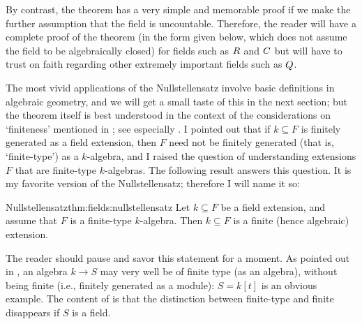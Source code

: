 By contrast, the theorem has a very simple and memorable proof if we
make the further assumption that the field is uncountable. Therefore,
the reader will have a complete proof of the theorem (in the form
given below, which does not assume the field to be algebraically
closed) for fields such as $R$ and $C$ but will have to trust on
faith regarding other extremely important fields such as $Q$.

The most vivid applications of the Nullstellensatz involve basic
definitions in algebraic geometry, and we will get a small taste of
this in the next section; but the theorem itself is best understood in
the context of the considerations on `finiteness' mentioned in
; see
especially . I pointed out that if
$k \subseteq F$ is finitely generated as a field extension, then $F$
need not be finitely generated (that is, `finite-type') as a
$k$-algebra, and I raised the question of understanding extensions $F$
that are finite-type $k$-algebras. The following result answers this
question. It is my favorite version of the Nullstellensatz; therefore
I will name it so:
\begin{thm}{Nullstellensatz}{thm:fields:nullstellensatz}
  Let $k \subseteq F$ be a field extension, and assume that $F$ is a
  finite-type $k$-algebra. Then $k \subseteq F$ is a finite (hence
  algebraic) extension.
\end{thm}
The reader should pause and savor this statement for a moment. As
pointed out in
, an algebra
$k \to S$ may very well be of finite type (as an algebra), without
being finite (i.e., finitely generated as a module): $S = k[t]$ is an
obvious example. The content of  is that the
distinction between finite-type and finite disappears if $S$ is a
field.

